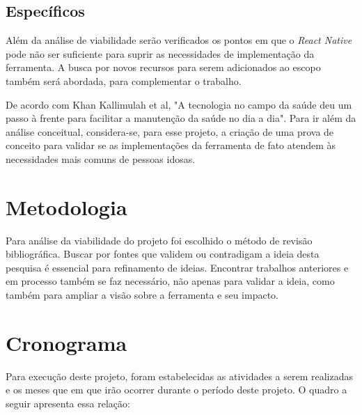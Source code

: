 \documentclass[
	12pt,				    %
	openright,			    %
	oneside,			    %
	a4paper,			    %
    sumario=tradicional,    %
	english,			    %
	brazil,				    %
	]{abntex2}              %
\begin{document}
\section{Específicos}

Além da análise de viabilidade serão verificados os pontos em que o \emph{React Native} pode não ser suficiente para suprir as necessidades de implementação da ferramenta. A busca por novos recursos para serem adicionados ao escopo também será abordada, para complementar o trabalho.

\par

De acordo com Khan Kallimulah et al, "A tecnologia no campo da saúde deu um passo à frente para facilitar a manutenção da saúde no dia a dia"\cite{KALIMULLAH2017352}. Para ir além da análise conceitual, considera-se, para esse projeto, a criação de uma prova de conceito para validar se as implementações da ferramenta de fato atendem às necessidades mais comuns de pessoas idosas.

\chapter{Metodologia}\label{sec:metodologia}


Para análise da viabilidade do projeto foi escolhido o método de revisão bibliográfica. Buscar por fontes que validem ou contradigam a ideia desta pesquisa é essencial para refinamento de ideias. Encontrar trabalhos anteriores e em processo também se faz necessário, não apenas para validar a ideia, como também para ampliar a visão sobre a ferramenta e seu impacto.

\chapter{Cronograma}\label{sec:cronograma}

Para execução deste projeto, foram estabelecidas as atividades a serem realizadas e os meses que em que irão ocorrer durante o período deste projeto. O quadro a seguir apresenta essa relação:

\par
\end{document}
